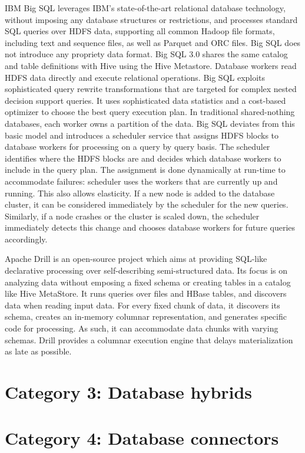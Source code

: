 \documentclass{vldb}
\begin{document}
IBM Big SQL \cite{bigsql} leverages IBM's state-of-the-art relational database technology, without imposing any database structures or restrictions, and processes standard SQL queries over HDFS data, supporting all common Hadoop file formats, including text and sequence files, as well as Parquet and ORC files. Big SQL does not introduce any propriety data format. Big SQL 3.0 shares the same catalog and table definitions with Hive using the Hive Metastore. Database workers read HDFS data directly and execute relational operations. Big SQL exploits sophisticated query rewrite transformations \cite{pirahesh96, winmagic} that are targeted for complex nested decision support queries. It uses sophisticated data statistics and a cost-based optimizer to choose the best query execution plan. In traditional shared-nothing databases, each worker owns a partition of the data. Big SQL deviates from this basic model and introduces a scheduler service that assigns HDFS blocks to database workers for processing on a query by query basis. The scheduler identifies where the HDFS blocks are and decides which database workers to include in the query plan. The assignment is done dynamically at run-time to accommodate failures: scheduler uses the workers that are currently up and running. This also allows elasticity. If a new node is added to the database cluster, it can be considered immediately by the scheduler for the new queries. Similarly, if a node crashes or the cluster is scaled down, the scheduler immediately detects this change and chooses database workers for future queries accordingly.

Apache Drill \cite{drill} is an open-source project which aims at providing SQL-like declarative processing over self-describing semi-structured data. Its focus is on analyzing data without emposing a fixed schema or creating tables in a catalog like Hive MetaStore. It runs queries over files and HBase tables, and discovers data when reading input data. For every fixed chunk of data, it discovers its schema, creates an in-memory columnar representation, and generates specific code for processing. As such, it can accommodate data chunks with varying schemas. Drill provides a columnar execution engine that delays materialization as late as possible.

\section{Category 3: Database hybrids}

\section{Category 4: Database connectors}
\end{document}

